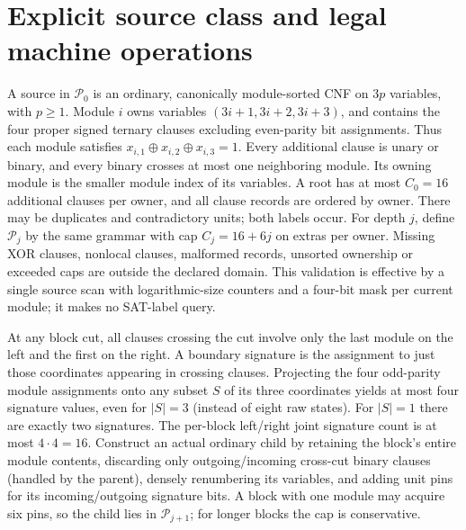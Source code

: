 \documentclass[11pt]{article}
\newcommand{\PATH}{\mathcal P}
\begin{document}
\section{Explicit source class and legal machine operations}
A source in $\PATH_0$ is an ordinary, canonically module-sorted CNF on
$3p$ variables, with $p\ge1$. Module $i$ owns variables
$(3i+1,3i+2,3i+3)$, and contains the four proper signed ternary
clauses excluding even-parity bit assignments. Thus each module
satisfies $x_{i,1}\oplus x_{i,2}\oplus x_{i,3}=1$. Every additional
clause is unary or binary, and every binary crosses at most
one neighboring module. Its owning module is the smaller module index
of its variables. A root has at most $C_0=16$ additional
clauses per owner, and all clause records are ordered by owner.
There may be duplicates and contradictory units; both labels occur.
For depth $j$, define $\PATH_j$ by the same grammar with cap
$C_j=16+6j$ on extras per owner. Missing XOR clauses,
nonlocal clauses, malformed records, unsorted ownership or exceeded
caps are outside the declared domain. This validation is effective by
a single source scan with logarithmic-size counters and a four-bit
mask per current module; it makes no SAT-label query.

At any block cut, all clauses crossing the cut involve only the last
module on the left and the first on the right. A boundary signature
is the assignment to just those coordinates appearing in crossing
clauses. Projecting the four odd-parity module assignments onto any
subset $S$ of its three coordinates yields at most four signature
values, even for $|S|=3$ (instead of eight raw states).
For $|S|=1$ there are exactly two signatures.
The per-block left/right joint signature count is at most $4\cdot4=16$.
Construct an actual ordinary child by retaining the block's entire
module contents, discarding only outgoing/incoming cross-cut binary
clauses (handled by the parent), densely renumbering its variables,
and adding unit pins for its incoming/outgoing signature bits. A block
with one module may acquire six pins, so the child lies in
$\PATH_{j+1}$; for longer blocks the cap is conservative.
\end{document}
